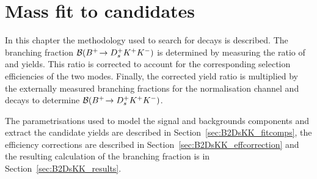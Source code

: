 \chapter{Mass fit to \decay{\Bp}{\Dsp\Kp\Km} candidates} 
\label{ch:B2DsKK}

\minitoc

In this chapter the methodology used to search for \decay{\Bp}{\Dsp\Kp\Km} decays is described.
The branching fraction ${\mathcal{B}}({{{B}^+}}\!\rightarrow {\ensuremath{{D}^+_{s}}}{\ensuremath{{K}^+}}{\ensuremath{{K}^-}})$ is determined by measuring the ratio of \decay{\Bp}{\Dsp\Kp\Km} and \decay{\Bp}{\Dsp\Dzb} yields. 
This ratio is corrected to account for the corresponding selection efficiencies of the two modes. Finally, the corrected yield ratio is multiplied by the externally measured branching fractions for the normalisation channel \decay{\Bp}{\Dsp\Dzb} and \decay{\Dzb}{\Kp\Km} decays to determine ${\mathcal{B}}({{{B}^+}}\!\rightarrow {\ensuremath{{D}^+_{s}}}{\ensuremath{{K}^+}}{\ensuremath{{K}^-}})$.




The parametrisations used to model the signal and backgrounds components and extract the candidate yields are described in Section~\ref{sec:B2DsKK_fitcomps}, the efficiency corrections are described in Section~\ref{sec:B2DsKK_effcorrection} and the resulting calculation of the branching fraction is in Section~\ref{sec:B2DsKK_results}.



